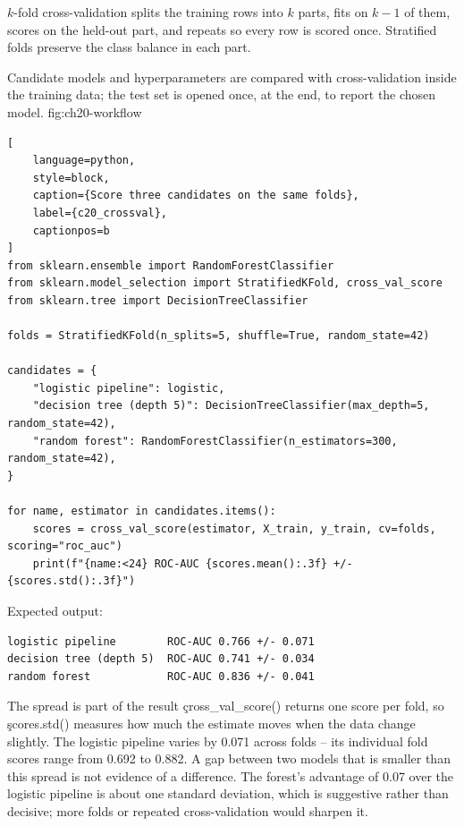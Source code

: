 $k$-fold cross-validation splits the training rows into $k$ parts, fits on
$k-1$ of them, scores on the held-out part, and repeats so every row is scored
once. Stratified folds preserve the class balance in each part.

{Candidate models and hyperparameters are compared with cross-validation inside the training data; the test set is opened once, at the end, to report the chosen model.}
{fig:ch20-workflow}

\begin{lstlisting}[
    language=python,
    style=block,
    caption={Score three candidates on the same folds},
    label={c20_crossval},
    captionpos=b
]
from sklearn.ensemble import RandomForestClassifier
from sklearn.model_selection import StratifiedKFold, cross_val_score
from sklearn.tree import DecisionTreeClassifier

folds = StratifiedKFold(n_splits=5, shuffle=True, random_state=42)

candidates = {
    "logistic pipeline": logistic,
    "decision tree (depth 5)": DecisionTreeClassifier(max_depth=5, random_state=42),
    "random forest": RandomForestClassifier(n_estimators=300, random_state=42),
}

for name, estimator in candidates.items():
    scores = cross_val_score(estimator, X_train, y_train, cv=folds, scoring="roc_auc")
    print(f"{name:<24} ROC-AUC {scores.mean():.3f} +/- {scores.std():.3f}")
\end{lstlisting}

Expected output:

\begin{lstlisting}[language=text, style=block, caption={Cross-validated comparison on training data only}, label={c20_crossval_output}, captionpos=b]
logistic pipeline        ROC-AUC 0.766 +/- 0.071
decision tree (depth 5)  ROC-AUC 0.741 +/- 0.034
random forest            ROC-AUC 0.836 +/- 0.041
\end{lstlisting}

\begin{SyntaxBox}{The spread is part of the result}
\c{cross_val_score()} returns one score per fold, so \c{scores.std()} measures how
much the estimate moves when the data change slightly. The logistic pipeline
varies by 0.071 across folds -- its individual fold scores range from 0.692 to
0.882. A gap between two models that is smaller than this spread is not evidence
of a difference. The forest's advantage of 0.07 over the logistic pipeline is
about one standard deviation, which is suggestive rather than decisive; more
folds or repeated cross-validation would sharpen it.
\end{SyntaxBox}

